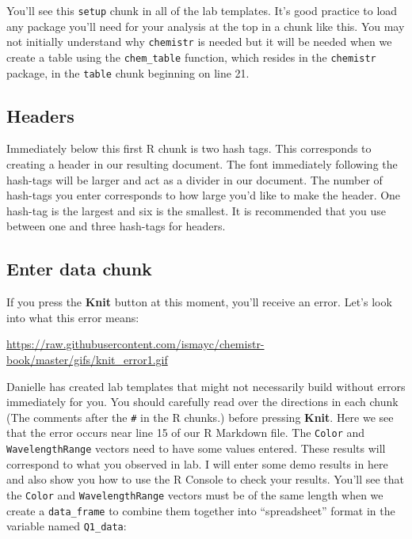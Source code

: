 \documentclass[]{tufte-book}
\begin{document}
You'll see this \texttt{setup} chunk in all of the lab templates. It's
good practice to load any package you'll need for your analysis at the
top in a chunk like this. You may not initially understand why
\texttt{chemistr} is needed but it will be needed when we create a table
using the \texttt{chem\_table} function, which resides in the
\texttt{chemistr} package, in the \texttt{table} chunk beginning on line
21.

\subsection{Headers}\label{headers}

Immediately below this first R chunk is two hash tags. This corresponds
to creating a header in our resulting document. The font immediately
following the hash-tags will be larger and act as a divider in our
document. The number of hash-tags you enter corresponds to how large
you'd like to make the header. One hash-tag is the largest and six is
the smallest. It is recommended that you use between one and three
hash-tags for headers.

\subsection{Enter data chunk}\label{enter-data-chunk}

If you press the \textbf{Knit} button at this moment, you'll receive an
error. Let's look into what this error means:

\vspace{0.1in}

\begin{center}\footnotesize{\url{https://raw.githubusercontent.com/ismayc/chemistr-book/master/gifs/knit_error1.gif}}\end{center}

\vspace{0.1in}

Danielle has created lab templates that might not necessarily build
without errors immediately for you. You should carefully read over the
directions in each chunk (The comments after the \texttt{\#} in the R
chunks.) before pressing \textbf{Knit}. Here we see that the error
occurs near line 15 of our R Markdown file. The \texttt{Color} and
\texttt{WavelengthRange} vectors need to have some values entered. These
results will correspond to what you observed in lab. I will enter some
demo results in here and also show you how to use the R Console to check
your results. You'll see that the \texttt{Color} and
\texttt{WavelengthRange} vectors must be of the same length when we
create a \texttt{data\_frame} to combine them together into
``spreadsheet'' format in the variable named \texttt{Q1\_data}:
\end{document}
